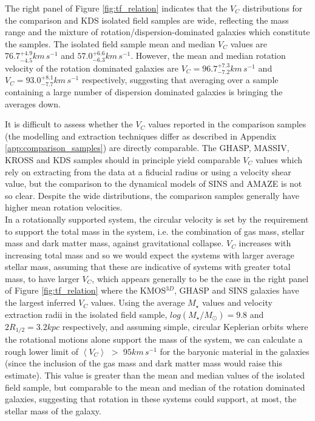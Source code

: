 \documentclass[fleqn,usenatbib]{mnras}
\begin{document}
\noindent
The right panel of Figure \ref{fig:tf_relation} indicates that the $V_{C}$ distributions for the comparison and KDS isolated field samples are wide, reflecting the mass range and the mixture of rotation/dispersion-dominated galaxies which constitute the samples.
The isolated field sample mean and median $V_{C}$ values are $76.7^{+4.9}_{-4.5}km\,s^{-1}$ and $57.0^{+6.6}_{-6.3}km\,s^{-1}$.
However, the mean and median rotation velocity of the rotation dominated galaxies are $V_{C} = 96.7^{+7.3}_{-7.2}km\,s^{-1}$ and $V_{C} = 93.0^{+8.1}_{-7.7}km\,s^{-1}$ respectively, suggesting that averaging over a sample containing a large number of dispersion dominated galaxies is bringing the averages down.

It is difficult to assess whether the $V_{C}$ values reported in the comparison samples (the modelling and extraction techniques differ as described in Appendix \ref{app:comparison_samples}) are directly comparable.
The GHASP, MASSIV, KROSS and KDS samples should in principle yield comparable $V_{C}$ values which rely on extracting from the data at a fiducial radius or using a velocity shear value, but the comparison to the dynamical models of SINS and AMAZE is not so clear.
Despite the wide distributions, the comparison samples generally have higher mean rotation velocities. \\

\noindent
In a rotationally supported system, the circular velocity is set by the requirement to support the total mass in the system, i.e. the combination of gas mass, stellar mass and dark matter mass, against gravitational collapse.
$V_{C}$ increases with increasing total mass and so we would expect the systems with larger average stellar mass, assuming that these are indicative of systems with greater total mass, to have larger $V_{C}$, which appears generally to be the case in the right panel of Figure \ref{fig:tf_relation} where the KMOS$^{3D}$, GHASP and SINS galaxies have the largest inferred $V_{C}$ values.
Using the average $M_{\star}$ values and velocity extraction radii in the isolated field sample, $log(M_{\star}/M_{\odot})=9.8$ and $2R_{1/2} = 3.2kpc$ respectively, and assuming simple, circular Keplerian orbits where the rotational motions alone support the mass of the system, we can calculate a rough lower limit of $\left<V_{C}\right>$ $>$ $95km\,s^{-1}$ for the baryonic material in the galaxies (since the inclusion of the gas mass and dark matter mass would raise this estimate).
This value is greater than the mean and median values of the isolated field sample, but comparable to the mean and median of the rotation dominated galaxies, suggesting that rotation in these systems could support, at most, the stellar mass of the galaxy.  
\end{document}
